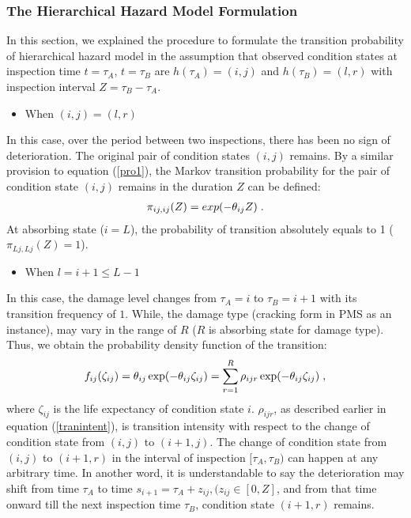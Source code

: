 \subsubsection{The Hierarchical Hazard Model Formulation}
\label{2422}
In this section, we explained the procedure to formulate the transition probability of hierarchical hazard model in the assumption that observed condition states at inspection time $t=\tau_A$, $t=\tau_B$ are $h(\tau_A)=(i,j)$ and $h(\tau_B)=(l,r)$ with inspection interval $Z=\tau_B-\tau_A$.
\begin{itemize}
\item{When $(i,j)=(l,r)$}
\end{itemize}
In this case, over the period between two inspections, there has been no sign of deterioration. The original pair of condition states $(i,j)$ remains. By a similar provision to equation (\ref{pro1}), the Markov transition probability for the pair of condition state $(i,j)$ remains in the duration $Z$ can be defined:
\begin{eqnarray}
\pi_{ij,ij}(Z)=exp(-\theta_{ij}Z)\hspace{1mm}.
\end{eqnarray}
At absorbing state ($i=L$), the probability of transition absolutely equals to 1 ($\pi_{Lj,Lj}(Z)=1$).
\begin{itemize}
\item{When $l=i+1 \leq L-1$}
\end{itemize}
In this case, the damage level changes from $\tau_A=i$ to $\tau_B=i+1$ with its transition frequency of $1$. While, the damage type (cracking form in PMS as an instance), may vary in the range of $R$ ($R$ is absorbing state for damage type). Thus, we obtain the probability density function of the transition:
\begin{eqnarray}
f_{ij} (\zeta _{ij} ) = \theta _{ij} \exp ( - \theta _{ij} \zeta _{ij} ) = \sum\limits_{r = 1}^R {\rho _{ijr} \exp ( - } \theta _{ij} \zeta _{ij} )\hspace{1mm},
\end{eqnarray}
where $\zeta_{ij}$ is the life expectancy of condition state $i$. $\rho_{ijr}$, as described earlier in equation (\ref{tranintent}), is transition intensity with respect to the change of condition state from $(i,j)$ to $(i+1,j)$. The change of condition state from $(i,j)$ to $(i+1,r)$ in the interval of inspection $[\tau_A,\tau_B)$ can  happen at any arbitrary time. In another word, it is understandable to say the deterioration may shift from time $\tau_A$ to time $s_{i+1}=\tau_A+z_{ij}, (z_{ij}\in [0,Z]$, and from that time onward till the next inspection time $\tau_B$, condition state $(i+1,r)$ remains.

